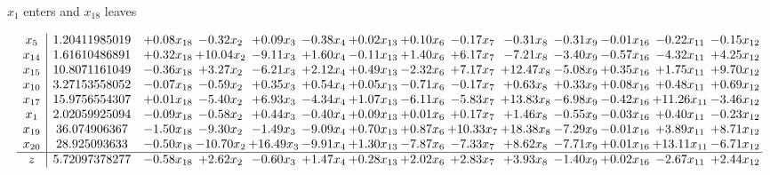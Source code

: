 \documentclass[8pt]{article}
\begin{document}
 $ x_{1} $ enters and $ x_{18} $ leaves 

 \[\begin{array}{c| c c@{\hskip 2pt} c@{\hskip 2pt} c@{\hskip 2pt} c@{\hskip 2pt} c@{\hskip 2pt} c@{\hskip 2pt} c@{\hskip 2pt} c@{\hskip 2pt} c@{\hskip 2pt} c@{\hskip 2pt} c@{\hskip 2pt} c@{\hskip 2pt} }
 x_{5}   &  1.20411985019 & +  0.08 x_{18} & -0.32 x_{2} & +  0.09 x_{3} & -0.38 x_{4} & +  0.02 x_{13} & +  0.10 x_{6} & -0.17 x_{7} & -0.31 x_{8} & -0.31 x_{9} & -0.01 x_{16} & -0.22 x_{11} & -0.15 x_{12}\\
 x_{14}   &  1.61610486891 & +  0.32 x_{18} & + 10.04 x_{2} & -9.11 x_{3} & +  1.60 x_{4} & -0.11 x_{13} & +  1.40 x_{6} & +  6.17 x_{7} & -7.21 x_{8} & -3.40 x_{9} & -0.57 x_{16} & -4.32 x_{11} & +  4.25 x_{12}\\
 x_{15}   &  10.8071161049 & -0.36 x_{18} & +  3.27 x_{2} & -6.21 x_{3} & +  2.12 x_{4} & +  0.49 x_{13} & -2.32 x_{6} & +  7.17 x_{7} & + 12.47 x_{8} & -5.08 x_{9} & +  0.35 x_{16} & +  1.75 x_{11} & +  9.70 x_{12}\\
 x_{10}   &  3.27153558052 & -0.07 x_{18} & -0.59 x_{2} & +  0.35 x_{3} & +  0.54 x_{4} & +  0.05 x_{13} & -0.71 x_{6} & -0.17 x_{7} & +  0.63 x_{8} & +  0.33 x_{9} & +  0.08 x_{16} & +  0.48 x_{11} & +  0.69 x_{12}\\
 x_{17}   &  15.9756554307 & +  0.01 x_{18} & -5.40 x_{2} & +  6.93 x_{3} & -4.34 x_{4} & +  1.07 x_{13} & -6.11 x_{6} & -5.83 x_{7} & + 13.83 x_{8} & -6.98 x_{9} & -0.42 x_{16} & + 11.26 x_{11} & -3.46 x_{12}\\
 x_{1}   &  2.02059925094 & -0.09 x_{18} & -0.58 x_{2} & +  0.44 x_{3} & -0.40 x_{4} & +  0.09 x_{13} & +  0.01 x_{6} & +  0.17 x_{7} & +  1.46 x_{8} & -0.55 x_{9} & -0.03 x_{16} & +  0.40 x_{11} & -0.23 x_{12}\\
 x_{19}   &  36.074906367 & -1.50 x_{18} & -9.30 x_{2} & -1.49 x_{3} & -9.09 x_{4} & +  0.70 x_{13} & +  0.87 x_{6} & + 10.33 x_{7} & + 18.38 x_{8} & -7.29 x_{9} & -0.01 x_{16} & +  3.89 x_{11} & +  8.71 x_{12}\\
 x_{20}   &  28.925093633 & -0.50 x_{18} & -10.70 x_{2} & + 16.49 x_{3} & -9.91 x_{4} & +  1.30 x_{13} & -7.87 x_{6} & -7.33 x_{7} & +  8.62 x_{8} & -7.71 x_{9} & +  0.01 x_{16} & + 13.11 x_{11} & -6.71 x_{12}\\
\hline
z    &  5.72097378277 & -0.58 x_{18} & +  2.62 x_{2} & -0.60 x_{3} & +  1.47 x_{4} & +  0.28 x_{13} & +  2.02 x_{6} & +  2.83 x_{7} & +  3.93 x_{8} & -1.40 x_{9} & +  0.02 x_{16} & -2.67 x_{11} & +  2.44 x_{12}\\
\end{array}\]
\end{document}
